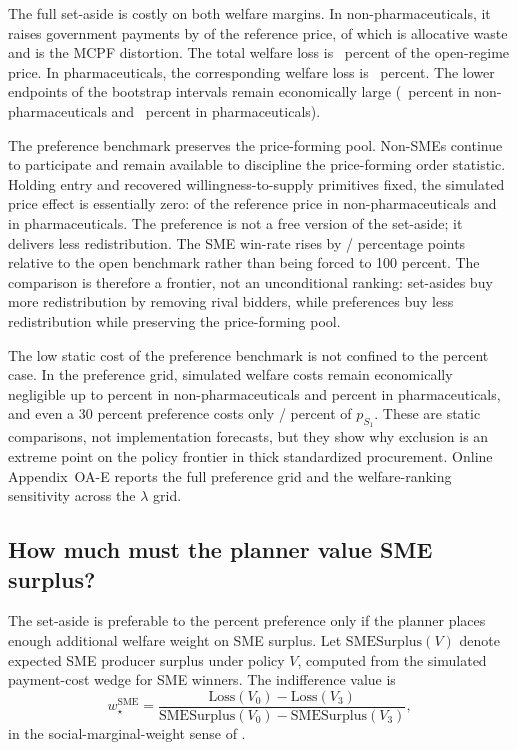 The full set-aside is costly on both welfare margins. In non-pharmaceuticals,
it raises government payments by \welfDeltaGovNp{} of the reference price, of
which \welfDwlAllocNp{} is allocative waste and \welfMcpfDistLthirtyNp{} is the
MCPF distortion. The total welfare loss is \welfLossPctLthirtyNp~percent of the
open-regime price. In pharmaceuticals, the corresponding welfare loss is
\welfLossPctLthirtyPh~percent. The lower endpoints of the bootstrap intervals
remain economically large (\welfLossPctLoNp~percent in non-pharmaceuticals and
\welfLossPctLoPh~percent in pharmaceuticals).

The preference benchmark preserves the price-forming pool. Non-SMEs
continue to participate and remain available to discipline the price-forming
order statistic. Holding entry and recovered willingness-to-supply
primitives fixed, the simulated price effect is essentially zero:
\optPrefShiftNp{} of the reference price in non-pharmaceuticals and
\vThreeShiftPh{} in pharmaceuticals. The preference is not a free version
of the set-aside; it delivers less redistribution. The SME win-rate rises
by \prefSmeWinGainTenNp/\prefSmeWinGainTenPh{} percentage points relative
to the open benchmark rather than being forced to 100 percent. The
comparison is therefore a frontier, not an unconditional ranking:
set-asides buy more redistribution by removing rival bidders, while
preferences buy less redistribution while preserving the price-forming
pool.

The low static cost of the preference benchmark is not confined to the \prefMainPct{}
percent case. In the preference grid, simulated welfare costs remain
economically negligible up to \prefSafeBandHiNp{} percent in
non-pharmaceuticals and \prefSafeBandHiPh{} percent in pharmaceuticals,
and even a 30 percent preference costs only
\welfPrefThirtyNp/\welfPrefThirtyPh{} percent of $p_{S_1}$. These are
static comparisons, not implementation forecasts, but they show why
exclusion is an extreme point on the policy frontier in thick
standardized procurement. Online Appendix~OA-E reports the full
preference grid and the welfare-ranking sensitivity across the $\lambda$
grid.

\subsection{How much must the planner value SME surplus?}

The set-aside is preferable to the \prefMainPct{} percent preference only if the planner
places enough additional welfare weight on SME surplus. Let
$\mathrm{SMESurplus}(V)$ denote expected SME producer surplus under policy
$V$, computed from the simulated payment-cost wedge for SME winners. The
indifference value is
\begin{equation}
    w^{\mathrm{SME}}_\star
    =
    \frac{\mathrm{Loss}(V_0)-\mathrm{Loss}(V_3)}
         {\mathrm{SMESurplus}(V_0)-\mathrm{SMESurplus}(V_3)},
    \label{eq:welfare_weight_v8}
\end{equation}
in the social-marginal-weight sense of \citet{saezstantcheva2016}.

